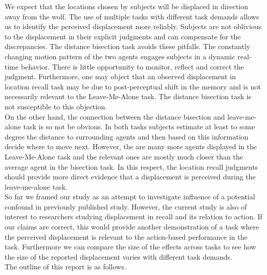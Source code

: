 \documentclass[10pt]{article}
\begin{document}
We expect that the locations chosen by subjects will be displaced in direction away from the wolf. 
The use of multiple tasks with different task demands allows us to identify the perceived displacement more reliably. 
Subjects are not oblivious to the displacement in their explicit judgments and can compensate for the discrepancies. %
The distance bisection task avoids these pitfalls.
The constantly changing motion pattern of the two agents engages subjects in a dynamic real-time behavior. 
There is little opportunity to monitor, reflect and correct the judgment. 
Furthermore, one may object that an observed displacement in location recall task may be due to post-perceptual shift in the memory and is not necessarily relevant to the Leave-Me-Alone task. 
The distance bisection task is not susceptible to this objection.\\
On the other hand, the connection between the distance bisection and leave-me-alone task is so not be obvious. 
In both tasks subjects estimate at least to some degree the distance to surrounding agents and then based on this information decide where to move next. 
However, the are many more agents displayed in the Leave-Me-Alone task and the relevant ones are mostly much closer than the average agent in the bisection task. 
In this respect, the location recall judgments should provide more direct evidence that a displacement is perceived during the leave-me-alone task. \\
So far we framed our study as an attempt to investigate influence of a potential confound in previously published study. 
However, the current study is also of interest to researchers studying displacement in recall and its relation to action. 
If our claims are correct, this would provide another demonstration of a task where the perceived displacement is relevant to the action-based performance in the task. %
Furthermore we can compare the size of the effects across tasks to see how the size of the reported displacement varies with different task demands.\\
The outline of this report is as follows. %

\end{document}

